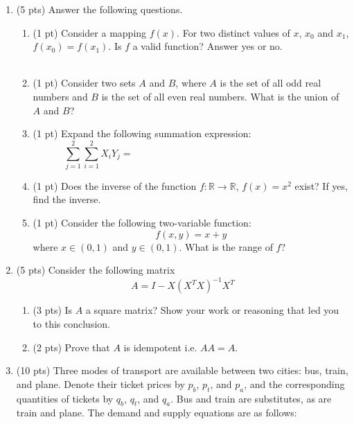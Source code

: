 \documentclass{./../../latex/tests}
\begin{document}
\thispagestyle{plain}
\vspace{0.5em}

\begin{enumerate}

\item (5 pts) Answer the following questions.
\begin{enumerate}
\item (1 pt) Consider a mapping $f(x)$. For two distinct values of $x$, $x_0$ and $x_1$, $f(x_0) = f(x_1)$. Is $f$ a valid function? Answer yes or no. \\~\\
\item (1 pt) Consider two sets $A$ and $B$, where $A$ is the set of all odd real numbers and $B$ is the set of all even real numbers. What is the union of $A$ and $B$?
\vspace{2.5cm}
\item (1 pt) Expand the following summation expression: \[\sum_{j=1}^2  \sum_{i=1}^2 X_i Y_j = \hspace{8cm}\]
\vspace{1.5cm}
\item (1 pt) Does the inverse of the function $f: \mathbb{R} \rightarrow \mathbb{R}$, $f(x)=x^2$ exist? If yes, find the inverse.
\vspace{2.5cm}
\item (1 pt) Consider the following two-variable function:
  \[ f(x,y) = x+y \]
  where $x \in (0,1)$ and $y \in (0,1)$. What is the range of $f$?
\vspace{2cm}
\end{enumerate}

\newpage
\item (5 pts) Consider the following matrix \[A = I - X(X^T X)^{-1}X^T \]
\begin{enumerate}
\item (3 pts)  Is $A$ a square matrix? Show your work or reasoning that led you to this conclusion. \vspace{4cm}
\item (2 pts) Prove that $A$ is idempotent i.e. $A A = A$. \vspace{6cm}
\end{enumerate}

\newpage
\item (10 pts) Three modes of transport are available between two cities: bus, train, and plane. Denote their ticket prices by $p_b$, $p_t$, and $p_a$, and the corresponding quantities of tickets by $q_b$, $q_t$, and $q_a$. Bus and train are substitutes, as are train and plane. The demand and supply equations are as follows:


\end{enumerate}
\end{document}
